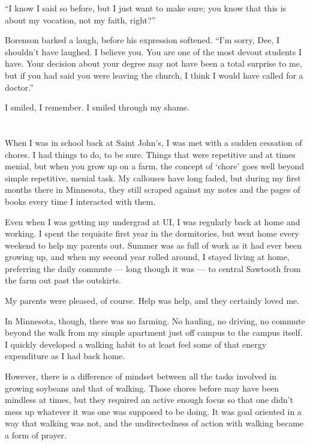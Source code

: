 ``I know I said so before, but I just want to make sure; you know that this is about my vocation, not my faith, right?''

Borenson barked a laugh, before his expression softened. ``I'm sorry, Dee, I shouldn't have laughed. I believe you. You are one of the most devout students I have. Your decision about your degree may not have been a total surprise to me, but if you had said you were leaving the church, I think I would have called for a doctor.''

I smiled, I remember. I smiled through my shame.

\section{}

When I was in school back at Saint John's, I was met with a sudden cessation of chores. I had things to do, to be sure. Things that were repetitive and at times menial, but when you grow up on a farm, the concept of `chore' goes well beyond simple repetitive, menial task. My callouses have long faded, but during my first months there in Minnesota, they still scraped against my notes and the pages of books every time I interacted with them.

Even when I was getting my undergrad at UI, I was regularly back at home and working. I spent the requisite first year in the dormitories, but went home every weekend to help my parents out. Summer was as full of work as it had ever been growing up, and when my second year rolled around, I stayed living at home, preferring the daily commute --- long though it was --- to central Sawtooth from the farm out past the outskirts.

My parents were pleased, of course. Help was help, and they certainly loved me.

In Minnesota, though, there was no farming. No hauling, no driving, no commute beyond the walk from my simple apartment just off campus to the campus itself. I quickly developed a walking habit to at least feel some of that energy expenditure as I had back home.

However, there is a difference of mindset between all the tasks involved in growing soybeans and that of walking. Those chores before may have been mindless at times, but they required an active enough focus so that one didn't mess up whatever it was one was supposed to be doing. It was goal oriented in a way that walking was not, and the undirectedness of action with walking became a form of prayer.

